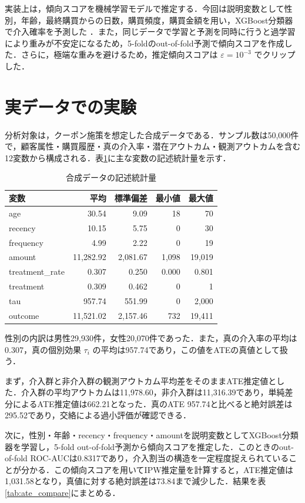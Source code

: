 \documentclass{article}
\begin{document}
実装上は，傾向スコアを機械学習モデルで推定する．今回は説明変数として性別，年齢，最終購買からの日数，購買頻度，購買金額を用い，XGBoost分類器で介入確率を予測した \cite{chen2016xgboost}．また，同じデータで学習と予測を同時に行うと過学習により重みが不安定になるため，5-foldのout-of-fold予測で傾向スコアを作成した．さらに，極端な重みを避けるため，推定傾向スコアは $\varepsilon=10^{-3}$ でクリップした．

\section{実データでの実験}
分析対象は，クーポン施策を想定した合成データである．サンプル数は50{,}000件で，顧客属性・購買履歴・真の介入率・潜在アウトカム・観測アウトカムを含む12変数から構成される．表\ref{tab:summary}に主な変数の記述統計量を示す．

\begin{table}[ht]
\centering
\caption{合成データの記述統計量}
\label{tab:summary}
\begin{tabular}{lrrrr}
\hline
変数 & 平均 & 標準偏差 & 最小値 & 最大値 \\
\hline
age & 30.54 & 9.09 & 18 & 70 \\
recency & 10.15 & 5.75 & 0 & 30 \\
frequency & 4.99 & 2.22 & 0 & 19 \\
amount & 11{,}282.92 & 2{,}081.67 & 1{,}098 & 19{,}019 \\
treatment\_rate & 0.307 & 0.250 & 0.000 & 0.801 \\
treatment & 0.309 & 0.462 & 0 & 1 \\
tau & 957.74 & 551.99 & 0 & 2{,}000 \\
outcome & 11{,}521.02 & 2{,}157.46 & 732 & 19{,}411 \\
\hline
\end{tabular}
\end{table}

性別の内訳は男性29{,}930件，女性20{,}070件であった．また，真の介入率の平均は0.307，真の個別効果 $\tau_i$ の平均は957.74であり，この値をATEの真値として扱う．

まず，介入群と非介入群の観測アウトカム平均差をそのままATE推定値とした．介入群の平均アウトカムは11{,}978.60，非介入群は11{,}316.39であり，単純差分によるATE推定値は662.21となった．真のATE 957.74と比べると絶対誤差は295.52であり，交絡による過小評価が確認できる．

次に，性別・年齢・recency・frequency・amountを説明変数としてXGBoost分類器を学習し，5-fold out-of-fold予測から傾向スコアを推定した．このときのout-of-fold ROC-AUCは0.8317であり，介入割当の構造を一定程度捉えられていることが分かる．この傾向スコアを用いてIPW推定量を計算すると，ATE推定値は1{,}031.58となり，真値に対する絶対誤差は73.84まで減少した．結果を表\ref{tab:ate_compare}にまとめる．
\end{document}
